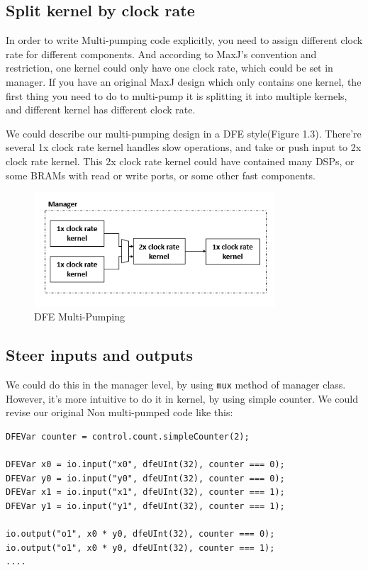 \documentclass[a4paper, 10pt]{report}
\begin{document}
\subsection{Split kernel by clock rate}
In order to write Multi-pumping code explicitly, you need to assign different clock rate for different components. And according to MaxJ's convention and restriction, one kernel could only have one clock rate, which could be set in manager. If you have an original MaxJ design which only contains one kernel, the first thing you need to do to multi-pump it is splitting it into multiple kernels, and different kernel has different clock rate.

We could describe our multi-pumping design in a DFE style(Figure 1.3). There're several 1x clock rate kernel handles slow operations, and take or push input to 2x clock rate kernel. This 2x clock rate kernel could have contained many DSPs, or some BRAMs with read or write ports, or some other fast components.

\begin{figure}[h!]
  \caption{DFE Multi-Pumping}
  \centering
    \includegraphics[width=0.8\textwidth]{dfe-mp-wireframe}
\end{figure}

\subsection{Steer inputs and outputs}
We could do this in the manager level, by using \texttt{mux} method of manager class. However, it's more intuitive to do it in kernel, by using simple counter. We could revise our original Non multi-pumped code like this:

\begin{lstlisting}[caption=Non multi-pumped kernel example, float]
DFEVar counter = control.count.simpleCounter(2);

DFEVar x0 = io.input("x0", dfeUInt(32), counter === 0);
DFEVar y0 = io.input("y0", dfeUInt(32), counter === 0);
DFEVar x1 = io.input("x1", dfeUInt(32), counter === 1);
DFEVar y1 = io.input("y1", dfeUInt(32), counter === 1);

io.output("o1", x0 * y0, dfeUInt(32), counter === 0);
io.output("o1", x0 * y0, dfeUInt(32), counter === 1);
....
\end{lstlisting}
\end{document}
